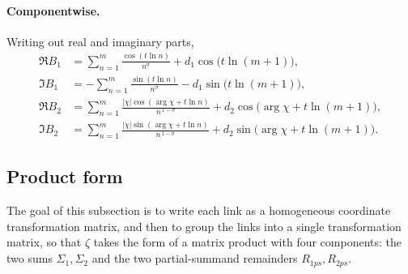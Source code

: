 \documentclass[11pt]{article}
\theoremstyle{definition}
\begin{document}
\paragraph{Componentwise.} Writing out real and imaginary parts,
\begin{align}
\Re B_1 &= \sum_{n=1}^{m}\frac{\cos(t\ln n)}{n^{\sigma}} + d_1\cos\bigl(t\ln(m+1)\bigr),\\
\Im B_1 &= -\sum_{n=1}^{m}\frac{\sin(t\ln n)}{n^{\sigma}} - d_1\sin\bigl(t\ln(m+1)\bigr),\\
\Re B_2 &= \sum_{n=1}^{m}\frac{|\chi|\cos(\arg\chi+t\ln n)}{n^{\,1-\sigma}} + d_2\cos\bigl(\arg\chi+t\ln(m+1)\bigr),\\
\Im B_2 &= \sum_{n=1}^{m}\frac{|\chi|\sin(\arg\chi+t\ln n)}{n^{\,1-\sigma}} + d_2\sin\bigl(\arg\chi+t\ln(m+1)\bigr).
\end{align}

\subsection{Product form}\label{sec:product-form}

The goal of this subsection is to write each link
as a homogeneous coordinate transformation matrix, and then to group the
links into a single transformation matrix, so that $\zeta$ takes the form
of a matrix product with four components: the two sums $\Sigma_1,\Sigma_2$
and the two partial-summand remainders $R_{1ps},R_{2ps}$.
\end{document}
